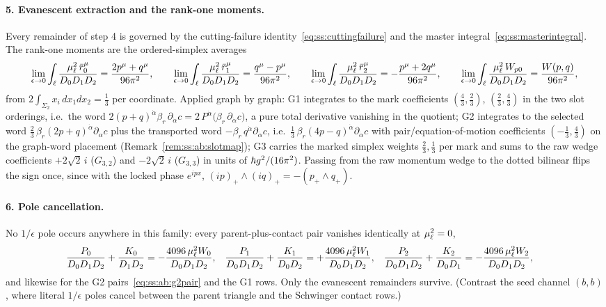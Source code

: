 \paragraph{5. Evanescent extraction and the rank-one moments.} Every remainder of step 4 is governed by the cutting-failure identity~\eqref{eq:ss:cuttingfailure} and the master integral~\eqref{eq:ss:masterintegral}. The rank-one moments are the ordered-simplex averages
\begin{equation}\label{eq:ss:ab:moments}
\lim_{\epsilon\to0}\int_{\ell}\frac{\mu_\ell^{2}\,\bar r_0^{\mu}}{D_0D_1D_2}
=\frac{2p^{\mu}+q^{\mu}}{96\pi^{2}},
\qquad
\lim_{\epsilon\to0}\int_{\ell}\frac{\mu_\ell^{2}\,\bar r_1^{\mu}}{D_0D_1D_2}
=\frac{q^{\mu}-p^{\mu}}{96\pi^{2}},
\qquad
\lim_{\epsilon\to0}\int_{\ell}\frac{\mu_\ell^{2}\,\bar r_2^{\mu}}{D_0D_1D_2}
=-\frac{p^{\mu}+2q^{\mu}}{96\pi^{2}},
\qquad
\lim_{\epsilon\to0}\int_{\ell}\frac{\mu_\ell^{2}\,W_{p0}}{D_0D_1D_2}
=\frac{W(p,q)}{96\pi^{2}},
\end{equation}
from $2\int_{\Sigma_2}x_i\,dx_1dx_2=\tfrac13$ per coordinate. Applied graph by graph: G1 integrates to the mark coefficients $(\tfrac43,\tfrac23)$, $(\tfrac23,\tfrac43)$ in the two slot orderings, i.e.\ the word $2(p+q)^{\dot\alpha}\beta_r\,\partial_{\dot\alpha}c=2\,P^{\dot\alpha}\bigl(\beta_r\,\partial_{\dot\alpha}c\bigr)$, a pure total derivative vanishing in the quotient; G2 integrates to the selected word $\tfrac23\,\beta_r(2p+q)^{\dot\alpha}\partial_{\dot\alpha}c$ plus the transported word $-\beta_r\,q^{\dot\alpha}\partial_{\dot\alpha}c$, i.e.\ $\tfrac13\,\beta_r(4p-q)^{\dot\alpha}\partial_{\dot\alpha}c$ with pair/equation-of-motion coefficients $(-\tfrac13,\tfrac43)$ on the graph-word placement (Remark~\ref{rem:ss:ab:slotmap}); G3 carries the marked simplex weights $\tfrac23,\tfrac13$ per mark and sums to the raw wedge coefficients $+2\sqrt2\,i$ ($G_{3,2}$) and $-2\sqrt2\,i$ ($G_{3,3}$) in units of $\hbar g^{2}/(16\pi^{2})$. Passing from the raw momentum wedge to the dotted bilinear flips the sign once, since with the locked phase $e^{ipx}$, $(ip)_+\wedge(iq)_+=-(p_+\wedge q_+)$.

\paragraph{6. Pole cancellation.} No $1/\epsilon$ pole occurs anywhere in this family: every parent-plus-contact pair vanishes identically at $\mu_\ell^{2}=0$,
\begin{align}
\frac{P_0}{D_0D_1D_2}+\frac{K_0}{D_1D_2}
&=-\frac{4096\,\mu_\ell^{2}W_0}{D_0D_1D_2},
&
\frac{P_1}{D_0D_1D_2}+\frac{K_1}{D_0D_2}
&=+\frac{4096\,\mu_\ell^{2}W_1}{D_0D_1D_2},
&
\frac{P_2}{D_0D_1D_2}+\frac{K_2}{D_0D_1}
&=-\frac{4096\,\mu_\ell^{2}W_2}{D_0D_1D_2},
\label{eq:ss:ab:polecancel}
\end{align}
and likewise for the G2 pairs~\eqref{eq:ss:ab:g2pair} and the G1 rows. Only the evanescent remainders survive. (Contrast the seed channel $(b,b)$, where literal $1/\epsilon$ poles cancel between the parent triangle and the Schwinger contact rows.)

